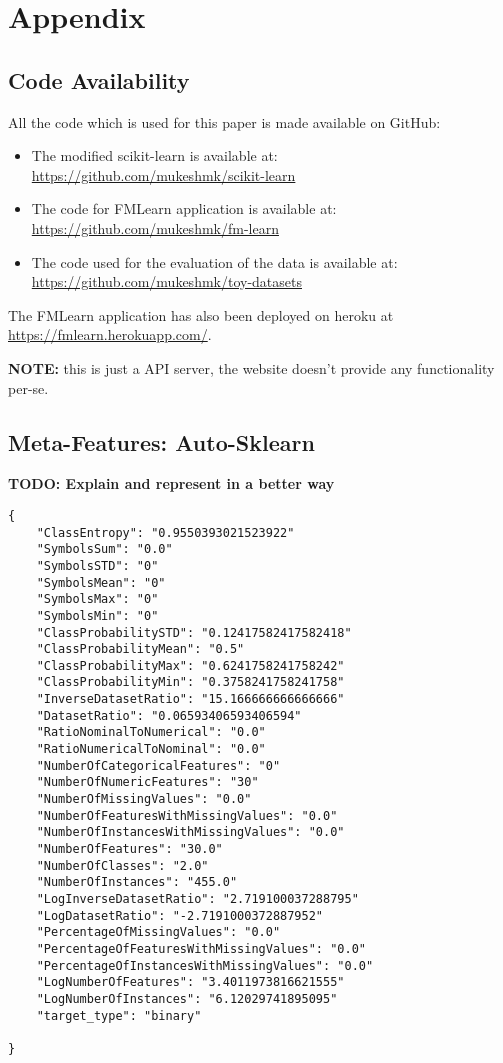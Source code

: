 \chapter{Appendix}
\section{Code Availability}
All the code which is used for this paper is made available on GitHub:
\begin{itemize}
    \item The modified scikit-learn is available at: \newline \href{https://github.com/mukeshmk/scikit-learn}{https://github.com/mukeshmk/scikit-learn}
    \item The code for FMLearn application is available at: \newline \href{https://github.com/mukeshmk/fm-learn}{https://github.com/mukeshmk/fm-learn}
    \item The code used for the evaluation of the data is available at: \newline \href{https://github.com/mukeshmk/toy-datasets}{https://github.com/mukeshmk/toy-datasets}
\end{itemize}
The FMLearn application has also been deployed on heroku at \href{https://fmlearn.herokuapp.com/}{https://fmlearn.herokuapp.com/}. 

\textbf{NOTE:} this is just a API server, the website doesn't provide any functionality per-se.

\section{Meta-Features: Auto-Sklearn}
\label{meta-features-ask}

\textbf{TODO: Explain and represent in a better way}

\begin{lstlisting}
{
	"ClassEntropy": "0.9550393021523922"
    "SymbolsSum": "0.0"
    "SymbolsSTD": "0"
    "SymbolsMean": "0"
    "SymbolsMax": "0"
    "SymbolsMin": "0"
    "ClassProbabilitySTD": "0.12417582417582418"
    "ClassProbabilityMean": "0.5"
    "ClassProbabilityMax": "0.6241758241758242"
    "ClassProbabilityMin": "0.3758241758241758"
    "InverseDatasetRatio": "15.166666666666666"
    "DatasetRatio": "0.06593406593406594"
    "RatioNominalToNumerical": "0.0"
    "RatioNumericalToNominal": "0.0"
    "NumberOfCategoricalFeatures": "0"
    "NumberOfNumericFeatures": "30"
    "NumberOfMissingValues": "0.0"
    "NumberOfFeaturesWithMissingValues": "0.0"
    "NumberOfInstancesWithMissingValues": "0.0"
    "NumberOfFeatures": "30.0"
    "NumberOfClasses": "2.0"
    "NumberOfInstances": "455.0"
    "LogInverseDatasetRatio": "2.719100037288795"
    "LogDatasetRatio": "-2.7191000372887952"
    "PercentageOfMissingValues": "0.0"
    "PercentageOfFeaturesWithMissingValues": "0.0"
    "PercentageOfInstancesWithMissingValues": "0.0"
    "LogNumberOfFeatures": "3.4011973816621555"
    "LogNumberOfInstances": "6.12029741895095"
    "target_type": "binary"

}
\end{lstlisting}

